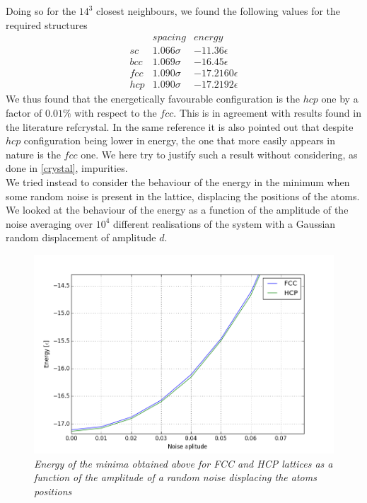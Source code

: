 \documentclass[a4paper]{article}
\begin{document}
Doing so for the $14^3$ closest neighbours, we found the following values for the required structures
\begin{eqnarray*}
&spacing&energy\\
sc&1.066\sigma&-11.36\epsilon\\
bcc&1.069\sigma&-16.45\epsilon\\
fcc&1.090\sigma&-17.2160\epsilon\\
hcp&1.090\sigma&-17.2192\epsilon
\end{eqnarray*}
We thus found that the energetically favourable configuration is the $hcp$ one by a factor of $0.01\%$ with respect to the $fcc$.
This is in agreement with results found in the literature ref{crystal}. 
In the same reference it is also pointed out that despite $hcp$ configuration being lower in energy, the one that more easily appears in nature is the $fcc$ one.
We here try to justify such a result without considering, as done in \ref{crystal}, impurities.\\
We tried instead to consider the behaviour of the energy in the minimum when some random noise is present in the lattice, displacing the positions of the atoms.
We looked at the behaviour of the energy as a function of the amplitude of the noise averaging over $10^4$ different realisations of the system with a Gaussian random displacement of amplitude $d$.

\begin{figure}[ht]
    \centering
    \includegraphics[width=12cm]{energy_noise.png}
    \caption{\it \label{noise}Energy of the minima obtained above for FCC and HCP lattices as a function of the amplitude of a random noise displacing the atoms positions}
\end{figure}
\end{document}
